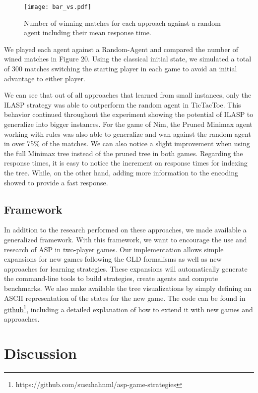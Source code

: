 \begin{figure}[H]
    \centering
    \texttt{[image: bar\_vs.pdf]}
    \caption{Number of winning matches for each approach against a random agent including their mean response time.}
\end{figure}

We played each agent against a Random-Agent and compared the number of wined matches in Figure 20. Using the classical initial state, we simulated a total of 300 matches switching the starting player in each game to avoid an initial advantage to either player. 

We can see that out of all approaches that learned from small instances, only the ILASP strategy was able to outperform the random agent in TicTacToe. This behavior continued throughout the experiment showing the potential of ILASP to generalize into bigger instances. For the game of Nim, the Pruned Minimax agent working with rules was also able to generalize and wan against the random agent in over 75\% of the matches. We can also notice a slight improvement when using the full Minimax tree instead of the pruned tree in both games. Regarding the response times, it is easy to notice the increment on response times for indexing the tree. While, on the other hand, adding more information to the encoding showed to provide a fast response.

\subsection{Framework}

In addition to the research performed on these approaches, we made available a generalized framework. With this framework, we want to encourage the use and research of ASP in two-player games. Our implementation allows simple expansions for new games following the GLD formalisms as well as new approaches for learning strategies. These expansions will automatically generate the command-line tools to build strategies, create agents and compute benchmarks. We also make available the tree visualizations by simply defining an ASCII representation of the states for the new game. The code can be found in \href{https://github.com/atreyasha/asp-game-strategies}{github}\footnote{https://github.com/susuhahnml/asp-game-strategies}, including a detailed explanation of how to extend it with new games and approaches. 



\section{Discussion}
\label{discussion}

